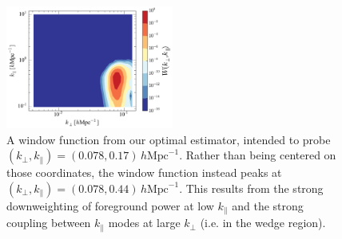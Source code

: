 \documentclass[twocolumn,aps,prd,nofootinbib,showpacs]{revtex4-1}
\begin{document}
\begin{figure}[!ht] 
	\centering 
	\includegraphics[width=0.49\textwidth]{figures/optEstOffset.pdf}
	\caption{A window function from our optimal estimator, intended to probe $(k_\perp, k_\parallel) = (0.078, 0.17)\,h\textrm{Mpc}^{-1}$.  Rather than being centered on those coordinates, the window function instead peaks at $(k_\perp, k_\parallel) = (0.078, 0.44)\,h\textrm{Mpc}^{-1}$.  This results from the strong downweighting of foreground power at low $k_\parallel$ and the strong coupling between $k_\parallel$ modes at large $k_\perp$ (i.e. in the wedge region).}
	\label{fig:optEstOffset}
\end{figure} 
\end{document}
